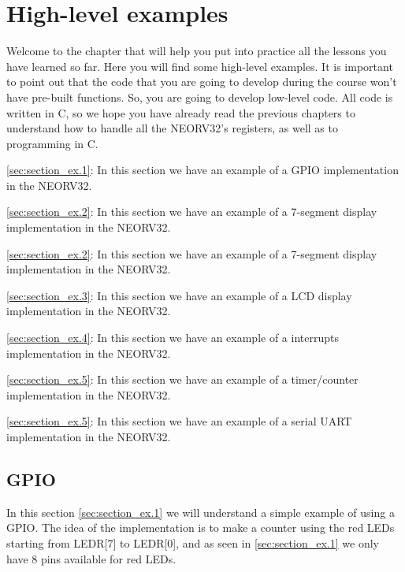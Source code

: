 %
%
%
%
%         
    
\chapter{High-level examples}\label{chp:chapter_ex}

    Welcome to the chapter that will help you put into practice all the lessons you have learned so far. Here you will find some high-level examples. It is important to point out that the code that you are going to develop during the course won't have pre-built functions. So, you are going to develop low-level code. All code is written in C, so we hope you have already read the previous chapters to understand how to handle all the NEORV32's registers, as well as to programming in C.

    \autoref{sec:section_ex.1}:
    In this section we have an example of a GPIO implementation in the NEORV32.
        
    \autoref{sec:section_ex.2}:
    In this section we have an example of a 7-segment display implementation in the NEORV32.

    \autoref{sec:section_ex.2}:
    In this section we have an example of a 7-segment display implementation in the NEORV32.

    \autoref{sec:section_ex.3}:
    In this section we have an example of a LCD display implementation in the NEORV32.

    \autoref{sec:section_ex.4}:
    In this section we have an example of a interrupts implementation in the NEORV32.
    
    \autoref{sec:section_ex.5}:
    In this section we have an example of a timer/counter implementation in the NEORV32.

    \autoref{sec:section_ex.5}:
    In this section we have an example of a serial UART implementation in the NEORV32.

    \section{GPIO}\label{sec:section_ex.1}

        In this section \autoref{sec:section_ex.1} we will understand a simple example of using a GPIO.
        The idea of the implementation is to make a counter using the red LEDs starting from LEDR[7] to LEDR[0], and as seen in \autoref{sec:section_ex.1} we only have 8 pins available for red LEDs.

